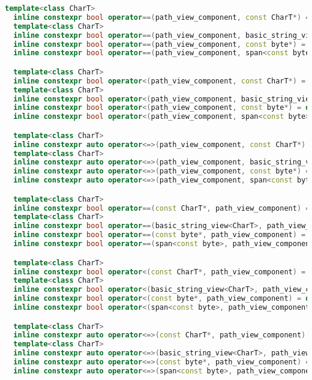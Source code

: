 \documentclass[11pt]{article}
\begin{document}
\begin{lstlisting}[language=cpp]
  template<class CharT>
  inline constexpr bool operator==(path_view_component, const CharT*) = delete;
  template<class CharT>
  inline constexpr bool operator==(path_view_component, basic_string_view<CharT>) = delete;
  inline constexpr bool operator==(path_view_component, const byte*) = delete;
  inline constexpr bool operator==(path_view_component, span<const byte>) = delete;

  template<class CharT>
  inline constexpr bool operator<(path_view_component, const CharT*) = delete;
  template<class CharT>
  inline constexpr bool operator<(path_view_component, basic_string_view<CharT>) = delete;
  inline constexpr bool operator<(path_view_component, const byte*) = delete;
  inline constexpr bool operator<(path_view_component, span<const byte>) = delete;

  template<class CharT>
  inline constexpr auto operator<=>(path_view_component, const CharT*) = delete;
  template<class CharT>
  inline constexpr auto operator<=>(path_view_component, basic_string_view<CharT>) = delete;
  inline constexpr auto operator<=>(path_view_component, const byte*) = delete;
  inline constexpr auto operator<=>(path_view_component, span<const byte>) = delete;

  template<class CharT>
  inline constexpr bool operator==(const CharT*, path_view_component) = delete;
  template<class CharT>
  inline constexpr bool operator==(basic_string_view<CharT>, path_view_component) = delete;
  inline constexpr bool operator==(const byte*, path_view_component) = delete;
  inline constexpr bool operator==(span<const byte>, path_view_component) = delete;

  template<class CharT>
  inline constexpr bool operator<(const CharT*, path_view_component) = delete;
  template<class CharT>
  inline constexpr bool operator<(basic_string_view<CharT>, path_view_component) = delete;
  inline constexpr bool operator<(const byte*, path_view_component) = delete;
  inline constexpr bool operator<(span<const byte>, path_view_component) = delete;

  template<class CharT>
  inline constexpr auto operator<=>(const CharT*, path_view_component) = delete;
  template<class CharT>
  inline constexpr auto operator<=>(basic_string_view<CharT>, path_view_component) = delete;
  inline constexpr auto operator<=>(const byte*, path_view_component) = delete;
  inline constexpr auto operator<=>(span<const byte>, path_view_component) = delete;
\end{lstlisting}
\end{document}
